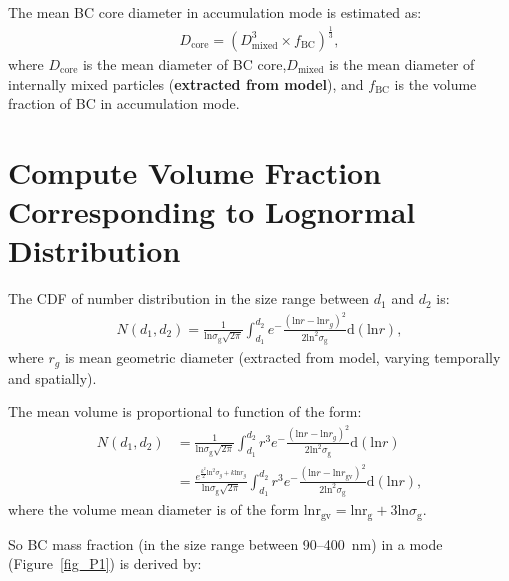 \documentclass[11pt]{article}
\begin{document}
\bigskip
\noindent The mean BC core diameter in accumulation mode is estimated as:
\begin{align*}
D_{\text{core}} = (D_{\text{mixed}}^3 \times f_{\text{BC}})^\frac{1}{3}, 
\end{align*}
where $D_{\text{core}}$ is the mean diameter of BC core,$D_{\text{mixed}}$ is the mean diameter of internally mixed particles (\textbf{extracted from model}), and $f_{\text{BC}}$ is the volume fraction of BC in accumulation mode.



 
\section{Compute Volume Fraction Corresponding to Lognormal Distribution}

The CDF of number distribution in the size range between $d_{1}$ and $d_{2}$ is:
\begin{align*}
N(d_{1}, d_{2}) = \frac{1}{\text{ln}\sigma_{\text{g}}\sqrt{2\pi}}\int_{d_{1}}^{d_{2}}e^-\frac{(\text{ln}r - \text{ln}r_{g})^2}{2\text{ln}^2\sigma_{\text{g}}}\text{d}(\text{ln}r),
\end{align*}
where $r_{g}$ is mean geometric diameter (extracted from model, varying temporally and spatially). 

\noindent The mean volume is proportional to function of the form:
\begin{align*}
N(d_{1}, d_{2}) &= \frac{1}{\text{ln}\sigma_{\text{g}}\sqrt{2\pi}}\int_{d_{1}}^{d_{2}}r^3e^-\frac{(\text{ln}r - \text{ln}r_{g})^2}{2\text{ln}^2\sigma_{\text{g}}}\text{d}(\text{ln}r)  \\
&=\frac{e^{\frac{k^2}{2}\text{ln}^2\sigma_{g}+k\text{ln}r_{g}}}{\text{ln}\sigma_{\text{g}}\sqrt{2\pi}}\int_{d_{1}}^{d_{2}}r^3e^-\frac{(\text{ln}r - \text{ln}r_{\text{gv}})^2}{2\text{ln}^2\sigma_{\text{g}}}\text{d}(\text{ln}r),
\end{align*}
where the volume mean diameter is of the form $\text{lnr}_{\text{gv}} = \text{lnr}_{\text{g}} + 3\text{ln}\sigma_{\text{g}}$.

\noindent So BC mass fraction (in the size range between 90--400~nm) in a mode (Figure~\ref{fig_P1}) is derived by:
\end{document}

